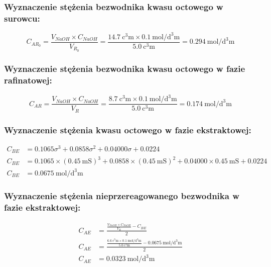 \documentclass[11pt]{article}
\begin{document}
\subsubsection{Wyznaczenie stężenia bezwodnika kwasu octowego w surowcu:}
\begin{equation}
C_{{AR}_0}=\frac{V_{NaOH}\times C_{NaOH}}{V_{{R}_0}}=\frac{\SI{14.7}{\cubic\centi\metre}\times \SI{0.1}{\mole\per\cubic\deci\metre}}{\SI{5.0}{\cubic\centi\metre}}=\SI{0.294}{\mole\per\cubic\deci\metre}
\end{equation}
\subsubsection{Wyznaczenie stężenia bezwodnika kwasu octowego w fazie rafinatowej:}
\begin{equation}
C_{AR}=\frac{V_{NaOH}\times C_{NaOH}}{V_{{R}}}=\frac{\SI{8.7}{\cubic\centi\metre}\times \SI{0.1}{\mole\per\cubic\deci\metre}}{\SI{5.0}{\cubic\centi\metre}}=\SI{0.174}{\mole\per\cubic\deci\metre}
\end{equation}
\subsubsection{Wyznaczenie stężenia kwasu octowego w fazie ekstraktowej:}
\begin{equation}
\begin{split}
C_{BE}&=0.1065\sigma^3+0.0858\sigma^2+0.04000\sigma+0.0224\\
C_{BE}&=0.1065\times(\SI{0.45}{\milli\siemens})^3+0.0858\times(\SI{0.45}{\milli\siemens})^2+0.04000\times \SI{0.45}{\milli\siemens}+0.0224\\
C_{BE}&=\SI{0.0675}{\mole\per\cubic\deci\metre}
\end{split}
\end{equation}
\subsubsection{Wyznaczenie stężenia nieprzereagowanego bezwodnika w fazie ekstraktowej:}
\begin{equation}
\begin{split}
C_{AE}&=\frac{\frac{V_{NaOH}\times C_{NaOH}}{V_E}-C_{BE}}{2}\\
C_{AE}&=\frac{\frac{\SI{6.6}{\cubic\centi\metre}\times\SI{0.1}{\mole\per\cubic\deci\metre}}{\SI{5.0}{\cubic\centi\metre}}-\SI{0.0675}{\mole\per\cubic\deci\metre}}{2}\\
C_{AE}&=\SI{0.0323}{\mole\per\cubic\deci\metre}
\end{split}
\end{equation}
\end{document}

